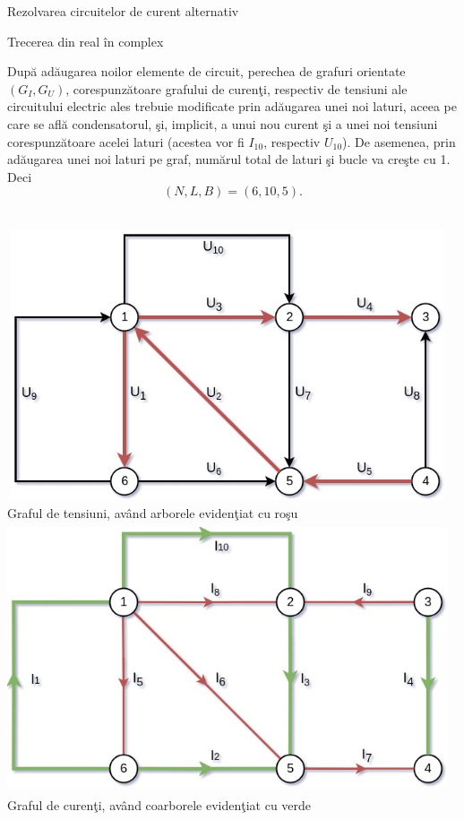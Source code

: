 \documentclass[a4paper]{article}
\begin{document}
\begin{section}{Rezolvarea circuitelor de curent alternativ}
\begin{subsection}{Trecerea din real \^ in complex\\}

	Dup\u a ad\u augarea noilor elemente de circuit, perechea de grafuri orientate $(G_I, G_U)$, corespunz\u atoare grafului de curen\c ti, respectiv de tensiuni ale circuitului electric ales trebuie modificate prin ad\u augarea unei noi laturi, aceea pe care se afl\u a condensatorul, \c si, implicit, a unui nou curent \c si a unei noi tensiuni corespunz\u atoare acelei laturi (acestea vor fi $ I_{10} $, respectiv $ U_{10} $).
	De asemenea, prin ad\u augarea unei noi laturi pe graf, num\u arul total de laturi \c si bucle va cre\c ste cu 1. Deci \large $$ (N, L, B) = (6, 10, 5). $$ \\ \normalsize
\par

\begin{center} 
	\includegraphics[width=13cm, height=8cm]{grafU.jpg} \\ 
	Graful de tensiuni, av\^ and arborele eviden\c tiat cu ro\c su \\[1.7cm]
	\includegraphics[width=13cm, height=8cm]{grafI.jpg} \\
	Graful de curen\c ti, av\^ and coarborele eviden\c tiat cu verde  \\[1cm] 
\end{center}


\end{subsection}
\end{section}
\end{document}
